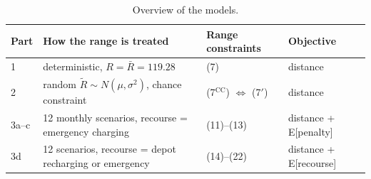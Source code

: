 \documentclass[11pt,a4paper]{article}
\theoremstyle{definition}
\begin{document}
\begin{table}[H]
\centering\small
\begin{tabularx}{\textwidth}{@{}l X l l@{}}
\toprule
Part & How the range is treated & Range constraints & Objective\\
\midrule
1 & deterministic, $R=\bar R=119.28$ & (7) & distance\\
2 & random $\tilde R\sim N(\mu,\sigma^2)$, chance constraint & (7$^{\mathrm{CC}}$) $\Leftrightarrow$ (7$'$) & distance\\
3a--c & 12 monthly scenarios, recourse = emergency charging & (11)--(13) & distance + E[penalty]\\
3d & 12 scenarios, recourse = depot recharging or emergency & (14)--(22) & distance + E[recourse]\\
\bottomrule
\end{tabularx}
\caption{Overview of the models.}
\end{table}

\end{document}
